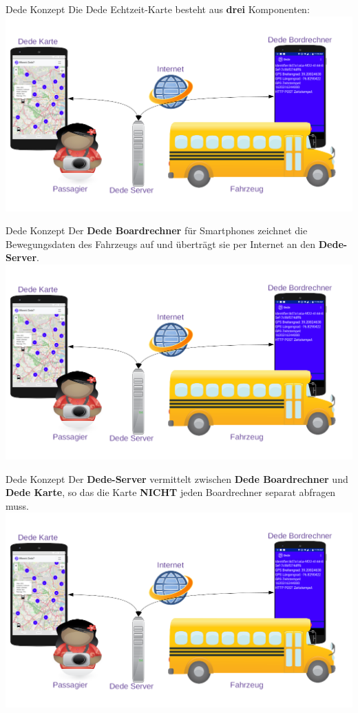
\begin{frame}{Dede Konzept}
  Die Dede Echtzeit-Karte besteht aus \textbf{drei} Komponenten:
  \includegraphics[width=\paperwidth]{dede/dede-concept}
\end{frame}

\begin{frame}{Dede Konzept}
  Der \textbf{Dede Boardrechner} für Smartphones zeichnet die Bewegungsdaten des Fahrzeugs auf und überträgt sie per Internet an den \textbf{Dede-Server}.
  \includegraphics[width=\paperwidth]{dede/dede-concept}
\end{frame}

\begin{frame}{Dede Konzept}
  Der \textbf{Dede-Server} vermittelt zwischen \textbf{Dede Boardrechner} und \textbf{Dede Karte}, so das die Karte \textbf{NICHT} jeden Boardrechner separat abfragen muss.
  \includegraphics[width=\paperwidth]{dede/dede-concept}
\end{frame}

